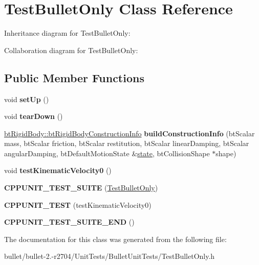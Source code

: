 \hypertarget{class_test_bullet_only}{\section{Test\+Bullet\+Only Class Reference}
\label{class_test_bullet_only}
}


Inheritance diagram for Test\+Bullet\+Only\+:


Collaboration diagram for Test\+Bullet\+Only\+:
\subsection*{Public Member Functions}
\begin{DoxyCompactItemize}
\item 
\hypertarget{class_test_bullet_only_a6e6188e54b921e7408d67013093f5e33}{void {\bfseries set\+Up} ()}\label{class_test_bullet_only_a6e6188e54b921e7408d67013093f5e33}

\item 
\hypertarget{class_test_bullet_only_a81b1a82602048307349dd748bb07e836}{void {\bfseries tear\+Down} ()}\label{class_test_bullet_only_a81b1a82602048307349dd748bb07e836}

\item 
\hypertarget{class_test_bullet_only_a9d2a8cadc2f7e097eb3c1a76a6dada2c}{\hyperlink{structbt_rigid_body_1_1bt_rigid_body_construction_info}{bt\+Rigid\+Body\+::bt\+Rigid\+Body\+Construction\+Info} {\bfseries build\+Construction\+Info} (bt\+Scalar mass, bt\+Scalar friction, bt\+Scalar restitution, bt\+Scalar linear\+Damping, bt\+Scalar angular\+Damping, bt\+Default\+Motion\+State \&\hyperlink{structstate}{state}, bt\+Collision\+Shape $\ast$shape)}\label{class_test_bullet_only_a9d2a8cadc2f7e097eb3c1a76a6dada2c}

\item 
\hypertarget{class_test_bullet_only_a83e21264ae29aef9ac71df00df48ce6c}{void {\bfseries test\+Kinematic\+Velocity0} ()}\label{class_test_bullet_only_a83e21264ae29aef9ac71df00df48ce6c}

\item 
\hypertarget{class_test_bullet_only_a3bc1f49c5538fac9f469b9783fc88917}{{\bfseries C\+P\+P\+U\+N\+I\+T\+\_\+\+T\+E\+S\+T\+\_\+\+S\+U\+I\+T\+E} (\hyperlink{class_test_bullet_only}{Test\+Bullet\+Only})}\label{class_test_bullet_only_a3bc1f49c5538fac9f469b9783fc88917}

\item 
\hypertarget{class_test_bullet_only_a75e466c74afaf5743129b285d006b3e3}{{\bfseries C\+P\+P\+U\+N\+I\+T\+\_\+\+T\+E\+S\+T} (test\+Kinematic\+Velocity0)}\label{class_test_bullet_only_a75e466c74afaf5743129b285d006b3e3}

\item 
\hypertarget{class_test_bullet_only_a817a4a380fd96a1e51af8af407574fc7}{{\bfseries C\+P\+P\+U\+N\+I\+T\+\_\+\+T\+E\+S\+T\+\_\+\+S\+U\+I\+T\+E\+\_\+\+E\+N\+D} ()}\label{class_test_bullet_only_a817a4a380fd96a1e51af8af407574fc7}

\end{DoxyCompactItemize}


The documentation for this class was generated from the following file\+:\begin{DoxyCompactItemize}
\item 
bullet/bullet-\/2.-\/r2704/\+Unit\+Tests/\+Bullet\+Unit\+Tests/Test\+Bullet\+Only.\+h\end{DoxyCompactItemize}
